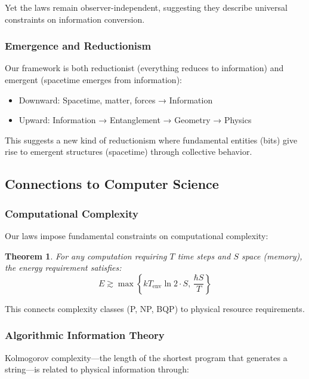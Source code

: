 \documentclass[11pt,a4paper]{article}
\theoremstyle{plain}
\newtheorem{theorem}{Theorem}[section]
\theoremstyle{definition}
\theoremstyle{remark}
\begin{document}
Yet the laws remain observer-independent, suggesting they describe universal constraints on information conversion.

\subsubsection{Emergence and Reductionism}

Our framework is both reductionist (everything reduces to information) and emergent (spacetime emerges from information):

\begin{itemize}[leftmargin=*]
\item Downward: Spacetime, matter, forces → Information
\item Upward: Information → Entanglement → Geometry → Physics
\end{itemize}

This suggests a new kind of reductionism where fundamental entities (bits) give rise to emergent structures (spacetime) through collective behavior.

\subsection{Connections to Computer Science}

\subsubsection{Computational Complexity}

Our laws impose fundamental constraints on computational complexity:

\begin{theorem}
For any computation requiring $T$ time steps and $S$ space (memory), the energy requirement satisfies:
\begin{equation}
E \gtrsim \max\left\{kT_{\text{env}}\ln 2\cdot S,\, \frac{\hbar S}{T}\right\}
\end{equation}
\end{theorem}

This connects complexity classes (P, NP, BQP) to physical resource requirements.

\subsubsection{Algorithmic Information Theory}

Kolmogorov complexity—the length of the shortest program that generates a string—is related to physical information through:
\end{document}
